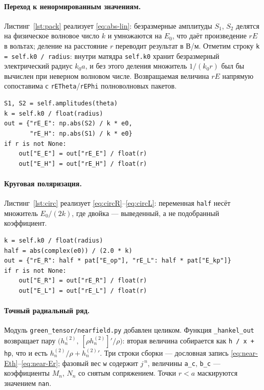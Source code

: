 \documentclass[11pt,a4paper]{article}
\newcommand{\hn}{h_n^{(2)}}
\begin{document}
\paragraph{Переход к ненормированным значениям.}
Листинг~\ref{lst:pack} реализует \eqref{eq:abs-lin}: безразмерные амплитуды $S_1$,
$S_2$ делятся на физическое волновое число $k$ и умножаются на $E_0$, что даёт
произведение $rE$ в вольтах; деление на расстояние $r$ переводит результат в В/м.
Отметим строку \texttt{k = self.k0 / radius}: внутри матядра
\texttt{self.k0} хранит безразмерный электрический радиус $k_0a$, и без этого
деления множитель $1/(k_0r)$ был бы вычислен при неверном волновом числе.
Возвращаемая величина $rE$ напрямую сопоставима с \texttt{rETheta}/\texttt{rEPhi}
полноволновых пакетов.

\begin{lstlisting}[style=py,caption={\texttt{sphere\_core.py::MieSphere.far\_field} ---
дифракционный амплитудный пакет \eqref{eq:abs-lin}},label={lst:pack}]
S1, S2 = self.amplitudes(theta)
k = self.k0 / float(radius)
out = {"rE_E": np.abs(S2) / k * e0,
       "rE_H": np.abs(S1) / k * e0}
if r is not None:
    out["E_E"] = out["rE_E"] / float(r)
    out["E_H"] = out["rE_H"] / float(r)
\end{lstlisting}

\paragraph{Круговая поляризация.}
Листинг~\ref{lst:circ} реализует \eqref{eq:circR}--\eqref{eq:circL}: переменная
\texttt{half} несёт множитель $E_0/(2k)$, где двойка --- выведенный, а не
подобранный коэффициент.

\begin{lstlisting}[style=py,caption={\texttt{sphere\_core.py::MieSphere.circular\_field}
--- абсолютные круговые компоненты \eqref{eq:circR}},label={lst:circ}]
k = self.k0 / float(radius)
half = abs(complex(e0)) / (2.0 * k)
out = {"rE_R": half * pat["E_op"], "rE_L": half * pat["E_kp"]}
if r is not None:
    out["E_R"] = out["rE_R"] / float(r)
    out["E_L"] = out["rE_L"] / float(r)
\end{lstlisting}

\paragraph{Точный радиальный ряд.}
Модуль \texttt{green\_tensor/nearfield.py} добавлен целиком.
Функция \texttt{\_hankel\_out} возвращает пару
$\bigl(\hn,\ [\rho\hn]'/\rho\bigr)$: вторая величина собирается как
\texttt{h / x + hp}, что и есть $\hn/\rho + \hn{}'$. Три строки сборки ---
дословная запись \eqref{eq:near-Eth}--\eqref{eq:near-Er}; фазовый вес \texttt{w}
содержит $j^{\,n}$, величины \texttt{a\_c}, \texttt{b\_c} --- коэффициенты $M_n$,
$N_n$ со снятым сопряжением. Точки $r < a$ маскируются значением \texttt{nan}.
\end{document}
